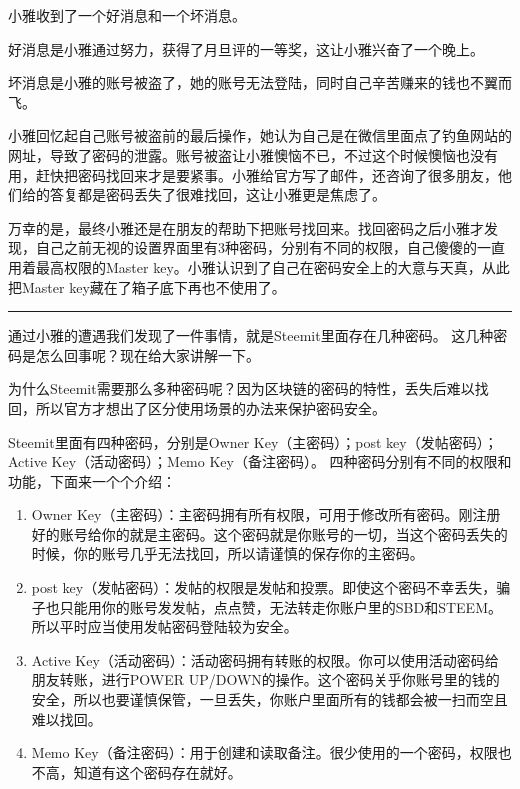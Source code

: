 \documentclass[]{ctexbook}
\providecommand{\tightlist}{%
  \setlength{\itemsep}{0pt}\setlength{\parskip}{0pt}}
\begin{document}
小雅收到了一个好消息和一个坏消息。

好消息是小雅通过努力，获得了月旦评的一等奖，这让小雅兴奋了一个晚上。

坏消息是小雅的账号被盗了，她的账号无法登陆，同时自己辛苦赚来的钱也不翼而飞。

小雅回忆起自己账号被盗前的最后操作，她认为自己是在微信里面点了钓鱼网站的网址，导致了密码的泄露。账号被盗让小雅懊恼不已，不过这个时候懊恼也没有用，赶快把密码找回来才是要紧事。小雅给官方写了邮件，还咨询了很多朋友，他们给的答复都是密码丢失了很难找回，这让小雅更是焦虑了。

万幸的是，最终小雅还是在朋友的帮助下把账号找回来。找回密码之后小雅才发现，自己之前无视的设置界面里有3种密码，分别有不同的权限，自己傻傻的一直用着最高权限的Master key。小雅认识到了自己在密码安全上的大意与天真，从此把Master key藏在了箱子底下再也不使用了。

\begin{center}\rule{0.5\linewidth}{\linethickness}\end{center}

通过小雅的遭遇我们发现了一件事情，就是Steemit里面存在几种密码。
这几种密码是怎么回事呢？现在给大家讲解一下。

为什么Steemit需要那么多种密码呢？因为区块链的密码的特性，丢失后难以找回，所以官方才想出了区分使用场景的办法来保护密码安全。

Steemit里面有四种密码，分别是Owner Key（主密码）；post key（发帖密码）；Active Key（活动密码）；Memo Key（备注密码）。
四种密码分别有不同的权限和功能，下面来一个个介绍：

\begin{enumerate}
\def\labelenumi{\arabic{enumi}.}
\tightlist
\item
  Owner Key（主密码）：主密码拥有所有权限，可用于修改所有密码。刚注册好的账号给你的就是主密码。这个密码就是你账号的一切，当这个密码丢失的时候，你的账号几乎无法找回，所以请谨慎的保存你的主密码。
\item
  post key（发帖密码）：发帖的权限是发帖和投票。即使这个密码不幸丢失，骗子也只能用你的账号发发帖，点点赞，无法转走你账户里的SBD和STEEM。所以平时应当使用发帖密码登陆较为安全。
\item
  Active Key（活动密码）：活动密码拥有转账的权限。你可以使用活动密码给朋友转账，进行POWER UP/DOWN的操作。这个密码关乎你账号里的钱的安全，所以也要谨慎保管，一旦丢失，你账户里面所有的钱都会被一扫而空且难以找回。
\item
  Memo Key（备注密码）：用于创建和读取备注。很少使用的一个密码，权限也不高，知道有这个密码存在就好。
\end{enumerate}
\end{document}
